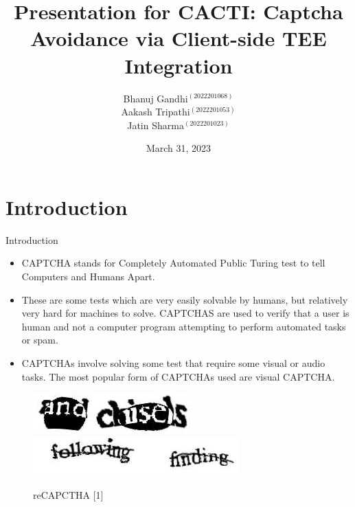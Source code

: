 \documentclass{beamer}
\title[CACTI]{Presentation for CACTI: Captcha Avoidance via Client-side TEE Integration}
\author{Bhanuj Gandhi$^{(2022201068)}$\\ Aakash Tripathi$^{(2022201053)}$\\ Jatin Sharma$^{(2022201023)}$}
\institute{International Institute of Information Technology, Hyderabad}
\date{March 31, 2023}
\begin{document}
\begin{frame}
  \titlepage
\end{frame}


\section{Introduction}

\begin{frame}{Introduction}

\begin{itemize}
  \item CAPTCHA stands for Completely Automated Public Turing test to tell Computers and Humans Apart.
  \item These are some tests which are very easily solvable by humans, but relatively very hard for machines to solve. CAPTCHAS are used to verify that a user is human and not a computer program attempting to perform automated tasks or spam.
  \item CAPTCHAs involve solving some test that require some visual or audio tasks. The most popular form of CAPTCHAs used are visual CAPTCHA.

\end{itemize}

\begin{figure}
	\includegraphics[scale=0.5]{img1.png}
	\includegraphics[scale=0.5]{img2.jpg}
	\caption{reCAPCTHA [1]}
\end{figure}

\end{frame}
\end{document}
